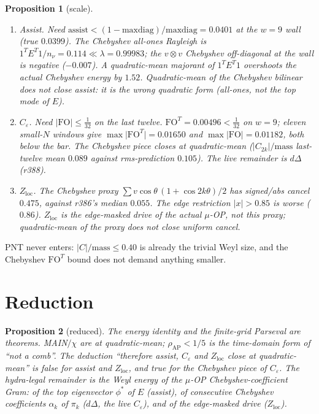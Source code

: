 \documentclass[11pt]{article}
\newtheorem{prop}{Proposition}
\theoremstyle{remark}
\begin{document}
\begin{prop}[scale]\label{prop:scale}
\begin{enumerate}
\item[(a)] \emph{Assist.}
Need $\mathrm{assist}<(1-\mathrm{maxdiag})/\mathrm{maxdiag}=0.0401$
at the $w=9$ wall (true $0.0399$).
The Chebyshev all-ones Rayleigh is $1^TE^T1/n_\nu=0.114\ll\lambda=0.99983$;
the $v\otimes v$ Chebyshev off-diagonal at the wall is \emph{negative}
($-0.007$).
A quadratic-mean majorant of $1^TE^T1$ overshoots the actual
Chebyshev energy by $1.52$.
Quadratic-mean of the Chebyshev bilinear does \emph{not} close assist:
it is the wrong quadratic form (all-ones, not the top mode of $E$).
\item[(b)] \emph{$C_\varepsilon$.}
Need $\lvert\mathrm{FO}\rvert\le\tfrac1{32}$ on the last twelve.
$\mathrm{FO}^T=0.00496<\tfrac1{32}$ on $w=9$;
eleven small-$N$ windows give $\max\lvert\mathrm{FO}^T\rvert=0.01650$
and $\max\lvert\mathrm{FO}\rvert=0.01182$, both below the bar.
The Chebyshev piece closes at quadratic-mean
($\lvert C_{2k}\rvert/\mathrm{mass}$ last-twelve mean $0.089$ against
rms-prediction $0.105$).
The live remainder is $d\Delta$ (r388).
\item[(c)] \emph{$Z_{\mathrm{loc}}$.}
The Chebyshev proxy $\sum v\cos\theta\,(1+\cos 2k\theta)/2$
has signed/abs cancel $0.475$, against r386's median $0.055$.
The edge restriction $\lvert x\rvert>0.85$ is \emph{worse} ($0.86$).
$Z_{\mathrm{loc}}$ is the edge-masked drive of the actual $\mu$-OP,
not this proxy; quadratic-mean of the proxy does not close uniform cancel.
\end{enumerate}
\end{prop}

PNT never enters: $\lvert C\rvert/\mathrm{mass}\le0.40$ is already
the trivial Weyl size, and the Chebyshev $\mathrm{FO}^T$ bound
does not demand anything smaller.

\section{Reduction}\label{sec:red}

\begin{prop}[reduced]\label{prop:red}
The energy identity and the finite-grid Parseval are theorems.
MAIN$/\chi$ are at quadratic-mean; $\rho_{\mathrm{AP}}<1/5$ is the
time-domain form of ``not a comb''.
The deduction ``therefore assist, $C_\varepsilon$ and $Z_{\mathrm{loc}}$
close at quadratic-mean'' is false for assist and $Z_{\mathrm{loc}}$,
and true for the Chebyshev piece of $C_\varepsilon$.
The hydra-legal remainder is the Weyl energy of the $\mu$-OP
Chebyshev-coefficient Gram: of the top eigenvector $\phi^*$ of $E$
(assist), of consecutive Chebyshev coefficients $\alpha_k$ of $\pi_k$
($d\Delta$, the live $C_\varepsilon$), and of the edge-masked drive
($Z_{\mathrm{loc}}$).
\end{prop}
\end{document}
